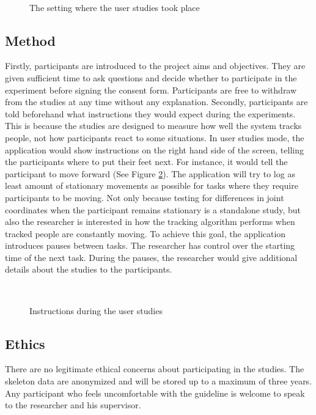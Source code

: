 \documentclass{sigchi}
\begin{document}
\begin{figure}[!h]
  \centering
  
  \caption{The setting where the user studies took place}~\label{fig:studies_setting}
\end{figure}

\subsection{Method}

Firstly, participants are introduced to the project aims and objectives. They are given sufficient time to ask questions and decide whether to participate in the experiment before signing the consent form. Participants are free to withdraw from the studies at any time without any explanation. Secondly, participants are told beforehand what instructions they would expect during the experiments. This is because the studies are designed to measure how well the system tracks people, not how participants react to some situations. In user studies mode, the application would show instructions on the right hand side of the screen, telling the participants where to put their feet next. For instance, it would tell the participant to move forward (See Figure \ref{fig:studies_instruction}). The application will try to log as least amount of stationary movements as possible for tasks where they require participants to be moving. Not only because testing for differences in joint coordinates when the participant remains stationary is a standalone study, but also the researcher is interested in how the tracking algorithm performs when tracked people are constantly moving. To achieve this goal, the application introduces pauses between tasks. The researcher has control over the starting time of the next task. During the pauses, the researcher would give additional details about the studies to the participants.

\begin{figure}[!h]
  \centering
  
  \caption{Instructions during the user studies}~\label{fig:studies_instruction}
\end{figure}

\subsection{Ethics}

There are no legitimate ethical concerns about participating in the studies. The skeleton data are anonymized and will be stored up to a maximum of three years. Any participant who feels uncomfortable with the guideline is welcome to speak to the researcher and his supervisor.
\end{document}
